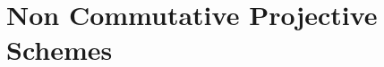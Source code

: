 \documentclass[10pt,draft]{book}
\begin{document}
\chapter{Non Commutative Projective Schemes}

%

%
%
\end{document}
